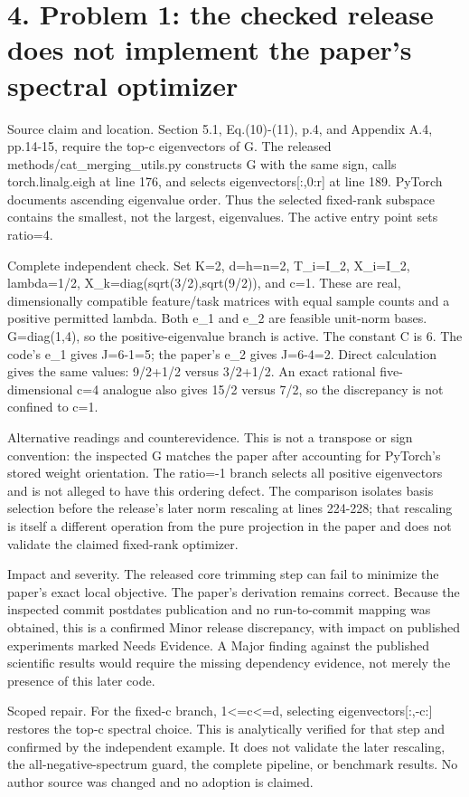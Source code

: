 \documentclass[10pt]{article}
\begin{document}
\section*{4. Problem 1: the checked release does not implement the paper’s spectral optimizer}
Source claim and location. Section 5.1, Eq.(10)-(11), p.4, and Appendix A.4, pp.14-15, require the top-c eigenvectors of G. The released methods/cat\_merging\_utils.py constructs G with the same sign, calls torch.linalg.eigh at line 176, and selects eigenvectors[:,0:r] at line 189. PyTorch documents ascending eigenvalue order. Thus the selected fixed-rank subspace contains the smallest, not the largest, eigenvalues. The active entry point sets ratio=4.\par
Complete independent check. Set K=2, d=h=n=2, T\_i=I\_2, X\_i=I\_2, lambda=1/2, X\_k=diag(sqrt(3/2),sqrt(9/2)), and c=1. These are real, dimensionally compatible feature/task matrices with equal sample counts and a positive permitted lambda. Both e\_1 and e\_2 are feasible unit-norm bases. G=diag(1,4), so the positive-eigenvalue branch is active. The constant C is 6. The code’s e\_1 gives J=6-1=5; the paper’s e\_2 gives J=6-4=2. Direct calculation gives the same values: 9/2+1/2 versus 3/2+1/2. An exact rational five-dimensional c=4 analogue also gives 15/2 versus 7/2, so the discrepancy is not confined to c=1.\par
Alternative readings and counterevidence. This is not a transpose or sign convention: the inspected G matches the paper after accounting for PyTorch’s stored weight orientation. The ratio=-1 branch selects all positive eigenvectors and is not alleged to have this ordering defect. The comparison isolates basis selection before the release’s later norm rescaling at lines 224-228; that rescaling is itself a different operation from the pure projection in the paper and does not validate the claimed fixed-rank optimizer.\par
Impact and severity. The released core trimming step can fail to minimize the paper’s exact local objective. The paper’s derivation remains correct. Because the inspected commit postdates publication and no run-to-commit mapping was obtained, this is a confirmed Minor release discrepancy, with impact on published experiments marked Needs Evidence. A Major finding against the published scientific results would require the missing dependency evidence, not merely the presence of this later code.\par
Scoped repair. For the fixed-c branch, 1<=c<=d, selecting eigenvectors[:,-c:] restores the top-c spectral choice. This is analytically verified for that step and confirmed by the independent example. It does not validate the later rescaling, the all-negative-spectrum guard, the complete pipeline, or benchmark results. No author source was changed and no adoption is claimed.\par
\end{document}
